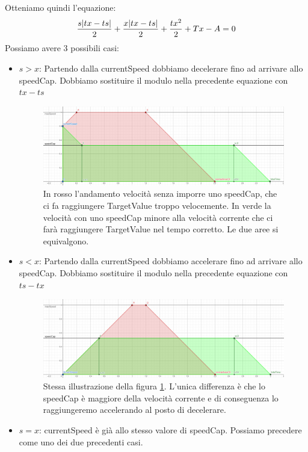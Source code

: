 \documentclass[main.tex]{subfiles}
\begin{document}
Otteniamo quindi l'equazione:
\[\frac{s\abs{tx - ts}}{2} + \frac{x\abs{tx - ts}}{2} + \frac{tx^2}{2} + Tx - A = 0\]
Possiamo avere 3 possibili casi:\newline
\begin{itemize}
    \item $s > x$: Partendo dalla currentSpeed dobbiamo decelerare fino ad arrivare allo speedCap. Dobbiamo sostituire il modulo nella precedente equazione con $tx - ts$
    \begin{figure}[H]
        \centering
        \includegraphics[width=.9\linewidth]{img/interpolazione/speedCapCalcGE.png}
        \caption{In rosso l'andamento velocità senza imporre uno speedCap, che ci fa raggiungere TargetValue troppo velocemente. In verde la velocità con uno speedCap  minore alla velocità corrente che ci farà raggiungere TargetValue nel tempo corretto. Le due aree si equivalgono.}
        \label{fig:4_speedCapCalcGE}
    \end{figure}
\clearpage %
    \item $s < x$: Partendo dalla currentSpeed dobbiamo accelerare fino ad arrivare allo speedCap. Dobbiamo sostituire il modulo nella precedente equazione con $ts - tx$
    \begin{figure}[H]
        \centering
        \includegraphics[width=.9\linewidth]{img/interpolazione/speedCapCalcBE.png}
        \caption{Stessa illustrazione della figura \ref{fig:4_speedCapCalcGE}. L'unica differenza è che lo speedCap è maggiore della velocità corrente e di conseguenza lo raggiungeremo accelerando al posto di decelerare.}
        \label{fig:4_speedCapCalcBE}
    \end{figure}

\item $s = x$: currentSpeed è già allo stesso valore di speedCap. Possiamo precedere come uno dei due precedenti casi. \newline
\end{itemize}
\end{document}
